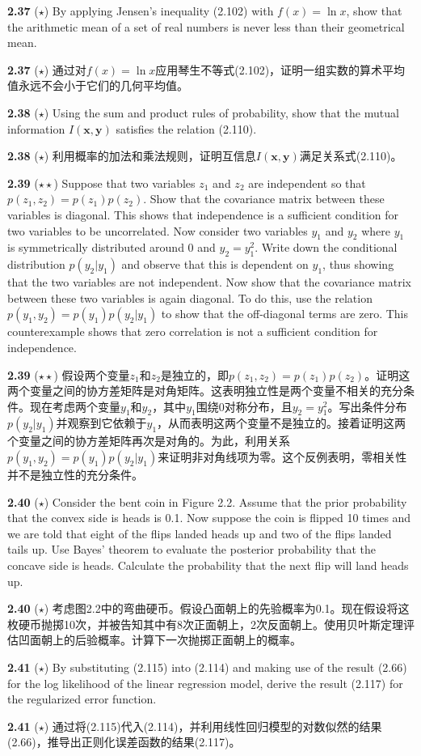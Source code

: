 \documentclass{article}
\begin{document}
\textbf{2.37} ($\star$) By applying Jensen’s inequality (2.102) with $f(x) = \ln x$, show that the arithmetic mean of a set of real numbers is never less than their geometrical mean.

\textbf{2.37} ($\star$) 通过对$f(x) = \ln x$应用琴生不等式(2.102)，证明一组实数的算术平均值永远不会小于它们的几何平均值。

\textbf{2.38} ($\star$) Using the sum and product rules of probability, show that the mutual information $I(\mathbf{x}, \mathbf{y})$ satisfies the relation (2.110).

\textbf{2.38} ($\star$) 利用概率的加法和乘法规则，证明互信息$I(\mathbf{x}, \mathbf{y})$满足关系式(2.110)。

\textbf{2.39} ($\star\star$) Suppose that two variables $z_1$ and $z_2$ are independent so that $p(z_1, z_2) = p(z_1)p(z_2)$. Show that the covariance matrix between these variables is diagonal. This shows that independence is a sufficient condition for two variables to be uncorrelated. Now consider two variables $y_1$ and $y_2$ where $y_1$ is symmetrically distributed around 0 and $y_2 = y_1^2$. Write down the conditional distribution $p(y_2|y_1)$ and observe that this is dependent on $y_1$, thus showing that the two variables are not independent. Now show that the covariance matrix between these two variables is again diagonal. To do this, use the relation $p(y_1, y_2) = p(y_1)p(y_2|y_1)$ to show that the off-diagonal terms are zero. This counterexample shows that zero correlation is not a sufficient condition for independence.

\textbf{2.39} ($\star\star$) 假设两个变量$z_1$和$z_2$是独立的，即$p(z_1, z_2) = p(z_1)p(z_2)$。证明这两个变量之间的协方差矩阵是对角矩阵。这表明独立性是两个变量不相关的充分条件。现在考虑两个变量$y_1$和$y_2$，其中$y_1$围绕0对称分布，且$y_2 = y_1^2$。写出条件分布$p(y_2|y_1)$并观察到它依赖于$y_1$，从而表明这两个变量不是独立的。接着证明这两个变量之间的协方差矩阵再次是对角的。为此，利用关系$p(y_1, y_2) = p(y_1)p(y_2|y_1)$来证明非对角线项为零。这个反例表明，零相关性并不是独立性的充分条件。

\textbf{2.40} ($\star$) Consider the bent coin in Figure 2.2. Assume that the prior probability that the convex side is heads is 0.1. Now suppose the coin is flipped 10 times and we are told that eight of the flips landed heads up and two of the flips landed tails up. Use Bayes’ theorem to evaluate the posterior probability that the concave side is heads. Calculate the probability that the next flip will land heads up.

\textbf{2.40} ($\star$) 考虑图2.2中的弯曲硬币。假设凸面朝上的先验概率为0.1。现在假设将这枚硬币抛掷10次，并被告知其中有8次正面朝上，2次反面朝上。使用贝叶斯定理评估凹面朝上的后验概率。计算下一次抛掷正面朝上的概率。

\textbf{2.41} ($\star$) By substituting (2.115) into (2.114) and making use of the result (2.66) for the log likelihood of the linear regression model, derive the result (2.117) for the regularized error function.

\textbf{2.41} ($\star$) 通过将(2.115)代入(2.114)，并利用线性回归模型的对数似然的结果(2.66)，推导出正则化误差函数的结果(2.117)。
\end{document}
